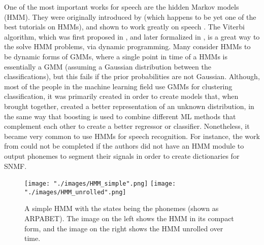One of the most important works for speech are the hidden Markov models (HMM). They were originally introduced by \cite{rabiner_juang_hmm} (which happens to be yet one of the best tutorials on HMMs), and shown to work greatly on speech \cite{rabiner_hmm_speech}. The Viterbi algorithm, which was first proposed in \cite{viterbi_original}, and later formalized in \cite{viterbi_algorithm}, is a great way to the solve HMM problems, via dynamic programming. Many consider HMMs to be dynamic forms of GMMs, where a single point in time of a HMMs is essentially a GMM (assuming a Gaussian distribution between the classifications), but this fails if the prior probabilities are not Gaussian. Although, most of the people in the machine learning field use GMMs for clustering classification, it was primarily created in order to create models that, when brought together, created a better representation of an unknown distribution, in the same way that boosting is used to combine different ML methods that complement each other to create a better regressor or classifier. Nonetheless, it became very common to use HMMs for speech recognition. For instance, the work from \cite{singlechannel} could not be completed if the authors did not have an HMM module to output phonemes to segment their signals in order to create dictionaries for SNMF.


\begin{figure}[ht]
\begin{center}
    \texttt{[image: "./images/HMM\_simple".png]}
    \texttt{[image: "./images/HMM\_unrolled".png]}
    \caption{ A simple HMM with the states being the phonemes (shown as ARPABET). The image on the left shows the HMM in its compact form, and the image on the right shows the HMM unrolled over time.}
    \label{fig::hmm_simple_unrolled}
\end{center}
\end{figure}

